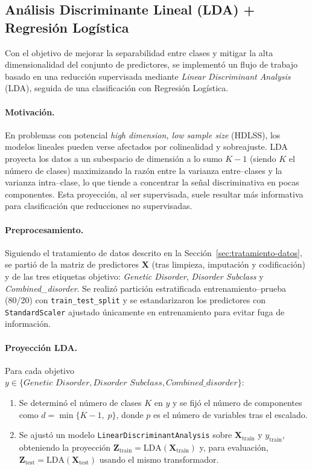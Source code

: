 \documentclass[11pt,a4paper,spanish]{book}
\numberwithin{equation}{chapter}
\numberwithin{figure}{chapter}
\begin{document}
\subsection{Análisis Discriminante Lineal (LDA) + Regresión Logística}
\label{subsec:lda-logit}

Con el objetivo de mejorar la separabilidad entre clases y mitigar la alta dimensionalidad del conjunto de predictores, se implementó un flujo de trabajo basado en una reducción supervisada mediante \textit{Linear Discriminant Analysis} (LDA), seguida de una clasificación con Regresión Logística. 

\paragraph{Motivación.}
En problemas con potencial \textit{high dimension, low sample size} (HDLSS), los modelos lineales pueden verse afectados por colinealidad y sobreajuste. LDA proyecta los datos a un subespacio de dimensión a lo sumo $K-1$ (siendo $K$ el número de clases) maximizando la razón entre la varianza entre–clases y la varianza intra–clase, lo que tiende a concentrar la señal discriminativa en pocas componentes. Esta proyección, al ser supervisada, suele resultar más informativa para clasificación que reducciones no supervisadas.

\paragraph{Preprocesamiento.}
Siguiendo el tratamiento de datos descrito en la Sección~\ref{sec:tratamiento-datos}, se partió de la matriz de predictores $\mathbf{X}$ (tras limpieza, imputación y codificación) y de las tres etiquetas objetivo:
\textit{Genetic Disorder}, \textit{Disorder Subclass} y \textit{Combined\_disorder}.
Se realizó partición estratificada entrenamiento--prueba (80/20) con \texttt{train\_test\_split} y se estandarizaron los predictores con \texttt{StandardScaler} ajustado únicamente en entrenamiento para evitar fuga de información.

\paragraph{Proyección LDA.}
Para cada objetivo $y \in \{\textit{Genetic Disorder}, \textit{Disorder Subclass}, \textit{Combined\_disorder}\}$:
\begin{enumerate}
    \item Se determinó el número de clases $K$ en $y$ y se fijó el número de componentes como $d=\min\{K-1,\;p\}$, donde $p$ es el número de variables tras el escalado.
    \item Se ajustó un modelo \texttt{LinearDiscriminantAnalysis} sobre $\mathbf{X}_{\text{train}}$ y $y_{\text{train}}$, obteniendo la proyección $\mathbf{Z}_{\text{train}}=\mathrm{LDA}(\mathbf{X}_{\text{train}})$ y, para evaluación, $\mathbf{Z}_{\text{test}}=\mathrm{LDA}(\mathbf{X}_{\text{test}})$ usando el mismo transformador.
\end{enumerate}
\end{document}
